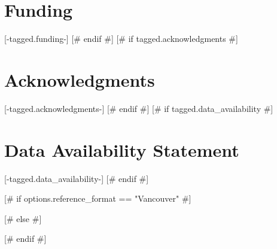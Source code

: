\documentclass[utf8]{FrontiersinVancouver} %
[# else #]
\begin{document}
\section*{Funding}
[-tagged.funding-]
[# endif #]
[# if tagged.acknowledgments #]
\section*{Acknowledgments}
[-tagged.acknowledgments-]
[# endif #]
[# if tagged.data_availability #]
\section*{Data Availability Statement}
[-tagged.data_availability-]
[# endif #]

[# if options.reference_format == "Vancouver" #]

% 
[# else #]

% 
[# endif #]



\end{document}
